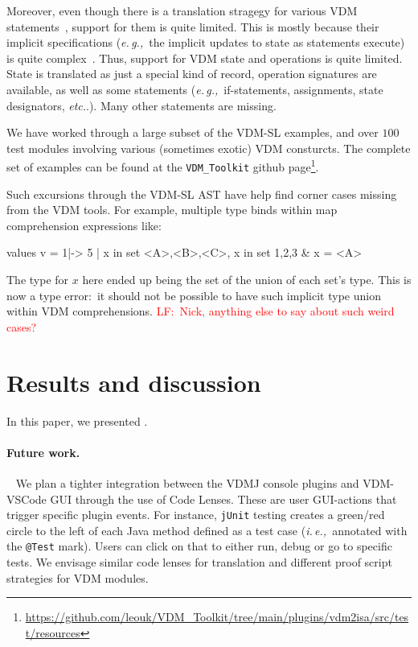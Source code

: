 \documentclass[runningheads,a4paper]{llncs}
\newcommand{\eg}{{\em e.\,g.,\/}}
\newcommand{\ie}{{\em i.\,e.,\/}}
\newcommand{\etc}{{\em etc.\/}}
\newcommand{\lfcomment}[1]{{\scriptsize\textcolor{red}{LF:~#1}}}
\begin{document}
Moreover, even though there is a translation stragegy for various VDM statements~\cite{NimFull}, support for them is quite limited. This is mostly because their implicit specifications (\eg~the implicit updates to state as statements execute) is quite complex~\cite{PJPhD}. Thus, support for VDM state and operations is quite limited. State is translated as just a special kind of record, operation signatures are available, as well as some statements (\eg~if-statements, assignments, state designators, \etc.). Many other statements are missing.      

We have worked through a large subset of the VDM-SL examples, and over \(100\) test modules involving various (sometimes exotic) VDM consturcts. The complete set of examples can be found at the \texttt{VDM\_Toolkit} github page\footnote{\url{https://github.com/leouk/VDM_Toolkit/tree/main/plugins/vdm2isa/src/test/resources}}.

Such excursions through the VDM-SL AST have help find corner cases missing from the VDM tools. For example, multiple type binds within map comprehension expressions like:
% 
\begin{vdmsl}[frame=none,basicstyle=\ttfamily\scriptsize]
    values 
        v = { 1|-> 5 | x in set {<A>,<B>,<C>}, x in set {1,2,3} & x = <A> }
\end{vdmsl}
%
The type for \(x\) here ended up being the set of the union of each set's type. This is now a type error:~it should not be possible to have such implicit type union within VDM comprehensions. \lfcomment{Nick, anything else to say about such weird cases?} 

\section{Results and discussion}\label{sec:Results}

In this paper, we presented .

\paragraph*{Future work.}~
%
We plan a tighter integration between the VDMJ console plugins and VDM-VSCode GUI through the use of Code Lenses. These are user GUI-actions that trigger specific plugin events. For instance, \texttt{jUnit} testing creates a green/red circle to the left of each Java method defined as a test case (\ie~annotated with the \texttt{@Test} mark). Users can click on that to either run, debug or go to specific tests. We envisage similar code lenses for translation and different proof script strategies for VDM modules.     
\end{document}
